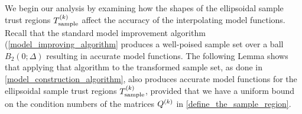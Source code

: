 \documentclass{article}
\begin{document}


We begin our analysis by examining how the shapes of the ellipsoidal sample trust regions ${T_{\text{sample}}^{(k)}}$ affect the accuracy of the interpolating model functions.
Recall that the standard model improvement algorithm (\cref{model_improving_algorithm} produces a well-poised sample set over a ball $B_2(0;\Delta)$ resulting in accurate model functions.
The following Lemma shows that applying that algorithm to the transformed sample set, as done in \cref{model_construction_algorithm},  also produces accurate model functions for the ellipsoidal sample trust regions ${T_{\text{sample}}^{(k)}}$,  provided that we have a uniform bound on the condition numbers of the matrices ${Q^{(k)}}$ in \cref{define_the_sample_region}.
\end{document}
